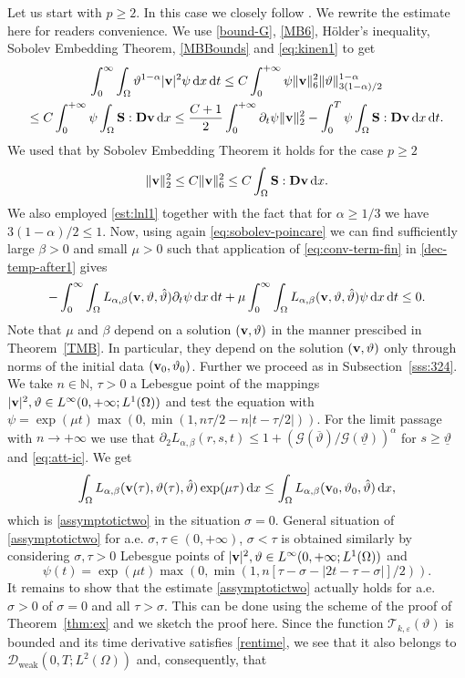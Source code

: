 \documentclass[11pt, a4paper, reqno]{amsart}
\newcommand{\N}{\mathbb N}
\numberwithin{equation}{section}
\newcommand{\dert}{\partial_t}
\newcommand{\thetah}{\hat\thet}
\newcommand{\vc}[1]{{\bf #1}}
\newcommand{\vv}{\vc{v}}
\newcommand{\thet}{\vartheta}
\renewcommand{\S}{\mathbf{S}}
\newcommand{\D}{\mathbf{D}}
\newcommand{\dt}{\,{\rm d} t }
\newcommand{\dx}{\,{\rm d} {x}}
\newcommand{\G}{\mathcal{G}}
\newcommand{\al}{\alpha}
\newcommand{\intT}[1]{\int_0^T #1  \dt}
\newcommand{\intnO}[1]{\int_0^{\infty}\intO{ #1 }\dt}
\newcommand{\intO}[1]{\int_{\Omega} #1 \dx}
\newcommand{\nm}[1]{\|#1\|}
\newcommand{\tmin}{\underline{\thet}}
\newcommand{\tmax}{\overline{\thet}}
\newcommand{\Lab}{L_{\alpha,\beta}}
\begin{document}
Let us start with $p\geq 2$. In this case we closely follow \cite[(3.26)]{AbBuKa2024}. We rewrite the estimate here for readers convenience. We use \eqref{bound-G}, \eqref{MB6}, H\"older's inequality, Sobolev Embedding Theorem, \eqref{MBBounds} and \eqref{eq:kinen1} to get 
\begin{multline}\label{eq:conv-term-fin}
\intnO{\thet^{1-\al}|\vv|^2\psi} \leq C\int_0^{+\infty}{\psi\nm{\vv}_6^2\nm{\thet}_{3(1-\alpha)/2}^{1-\al}}\\\leq C\int_0^{+\infty}{\psi\intO{\S:\D{\vv}}} \leq \frac {C+1}2\int_0^{+\infty}{\dert\psi\nm{\vv}_2^2}-\intT{\psi\intO{\S:\D{\vv}}}.
\end{multline}
We used that by Sobolev Embedding Theorem it holds for the case $p\geq 2$
\begin{equation}\label{eq:sobolev-poincare}
\nm{\vv}_2^2\leq C\nm{\vv}_6^2\leq C\intO{\S:\D{\vv}}.
\end{equation}
We also employed \eqref{est:lnl1} together with the fact that for $\alpha \geq1/3$ we have $3(1-\alpha)/2\leq1$.
Now, using again \eqref{eq:sobolev-poincare} we can find sufficiently large $\beta>0$ and small $\mu>0$ such that application of \eqref{eq:conv-term-fin} in \eqref{dec-temp-after1} gives
$$
-\intnO{\Lab(\vv,\thet,\thetah)\dert\psi}+\mu\intnO{\Lab(\vv,\thet,\thetah)\psi}\leq 0.
$$
Note that $\mu$ and $\beta$ depend on a solution $(\vv,\thet)$ in the manner prescibed in Theorem~\ref{TMB}. In particular, they depend on the solution $(\vv,\thet)$ only through norms of the initial data $(\vv_0,\thet_0)$.
Further we proceed as in Subsection~\ref{sss:324}. We take $n\in\N$, $\tau>0$ a Lebesgue point of the mappings $|\vv|^2,\thet\in L^\infty(0,+\infty;L^1(\Omega))$ and test the equation with $\psi=\exp(\mu t)\max(0,\min(1,n\tau/2-n|t-\tau/2|))$. For the limit passage with $n\to+\infty$ we use that $\partial_2\Lab(r,s,t)\leq 1+(\G(\tmax)/\G(\tmin))^\alpha$ for $s\geq\tmin$ and \eqref{eq:att-ic}. We get
\begin{equation}\label{hle}
\intO{\Lab(\vv(\tau),\thet(\tau),\thetah)\exp(\mu \tau)}\leq \intO{\Lab(\vv_0,\thet_0,\thetah)},
\end{equation}
which is \eqref{assymptotictwo} in the situation $\sigma=0$. General situation of \eqref{assymptotictwo} for a.e. $\sigma,\tau\in (0,+\infty)$, $\sigma<\tau$ is obtained similarly by considering $\sigma,\tau>0$ Lebesgue points of $|\vv|^2,\thet\in L^\infty(0,+\infty;L^1(\Omega))$ and 
$$
\psi(t)=\exp(\mu t)\max(0,\min(1,n[\tau-\sigma-|2t-\tau-\sigma|]/2)).
$$
It remains to show that the estimate \eqref{assymptotictwo} actually holds for a.e. $\sigma>0$ of $\sigma=0$ and all $\tau>\sigma$. This can be done using the scheme of the proof of Theorem~\ref{thm:ex}  and  we sketch the proof here. Since the function $\mathcal{T}_{k,\varepsilon}(\thet)$ is bounded and its time derivative satisfies \eqref{rentime}, we see that it also belongs to $\mathcal{D}_{\textrm{weak}}(0,T; L^2(\Omega))$ and, consequently, that
\end{document}
